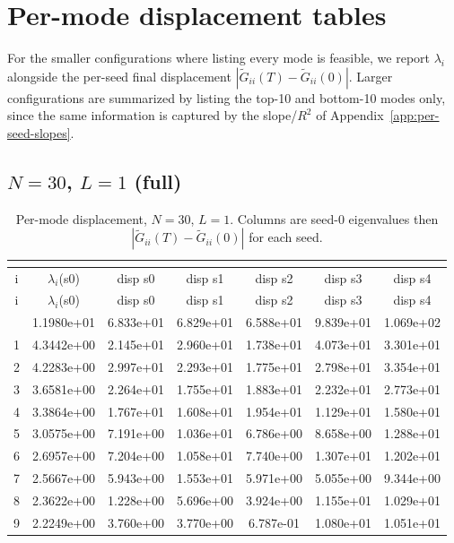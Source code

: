 \section{Per-mode displacement tables}
\label{app:per-mode}

For the smaller configurations where listing every mode is feasible, we report $\lambda_i$ alongside the per-seed final displacement $|\widetilde{G}_{ii}(T) - \widetilde{G}_{ii}(0)|$. Larger configurations are summarized by listing the top-10 and bottom-10 modes only, since the same information is captured by the slope/$R^2$ of Appendix~\ref{app:per-seed-slopes}.

\subsection{$N=30$, $L=1$ (full)}
\begin{longtable}{c c c c c c c}
\caption{Per-mode displacement, $N=30$, $L=1$. Columns are seed-0 eigenvalues then $|\widetilde{G}_{ii}(T)-\widetilde{G}_{ii}(0)|$ for each seed.}\\
\label{tab:permode-N30-L1}\\
\toprule
i & $\lambda_i$(s0) & disp s0 & disp s1 & disp s2 & disp s3 & disp s4 \\
\midrule
\endfirsthead
\toprule
i & $\lambda_i$(s0) & disp s0 & disp s1 & disp s2 & disp s3 & disp s4 \\
\midrule
\endhead
\bottomrule
\endfoot
0 & 1.1980e+01 & 6.833e+01 & 6.829e+01 & 6.588e+01 & 9.839e+01 & 1.069e+02 \\
1 & 4.3442e+00 & 2.145e+01 & 2.960e+01 & 1.738e+01 & 4.073e+01 & 3.301e+01 \\
2 & 4.2283e+00 & 2.997e+01 & 2.293e+01 & 1.775e+01 & 2.798e+01 & 3.354e+01 \\
3 & 3.6581e+00 & 2.264e+01 & 1.755e+01 & 1.883e+01 & 2.232e+01 & 2.773e+01 \\
4 & 3.3864e+00 & 1.767e+01 & 1.608e+01 & 1.954e+01 & 1.129e+01 & 1.580e+01 \\
5 & 3.0575e+00 & 7.191e+00 & 1.036e+01 & 6.786e+00 & 8.658e+00 & 1.288e+01 \\
6 & 2.6957e+00 & 7.204e+00 & 1.058e+01 & 7.740e+00 & 1.307e+01 & 1.202e+01 \\
7 & 2.5667e+00 & 5.943e+00 & 1.553e+01 & 5.971e+00 & 5.055e+00 & 9.344e+00 \\
8 & 2.3622e+00 & 1.228e+00 & 5.696e+00 & 3.924e+00 & 1.155e+01 & 1.029e+01 \\
9 & 2.2249e+00 & 3.760e+00 & 3.770e+00 & 6.787e-01 & 1.080e+01 & 1.051e+01 \\

\end{longtable}
